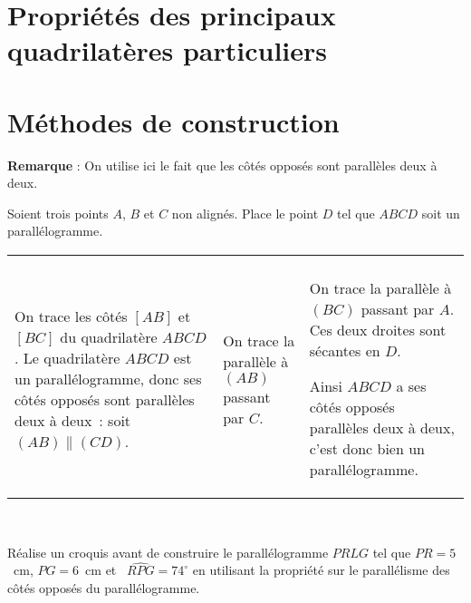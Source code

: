 \section{Propriétés des principaux quadrilatères particuliers}



\section{Méthodes de construction}

\begin{methode*1}

\vspace{0.8em}
\textcolor{H1}{\textbf{Remarque}} : On utilise ici le fait que les côtés opposés sont parallèles deux à deux.

\begin{exemple*1}
Soient trois points $A$, $B$ et $C$ non alignés. Place le point $D$ tel que $ABCD$ soit un parallélogramme.\\[0.5em]


\begin{tabularx}{\textwidth}{X|X|X}
   \qquad  &  &  \\ 
 
 
 On trace les côtés $[AB]$ et $[BC]$ du quadrilatère $ABCD$. Le quadrilatère $ABCD$ est un parallélogramme, donc ses côtés opposés sont parallèles deux à deux : soit $(AB) \parallel (CD)$. & On trace la parallèle à $(AB)$ passant par $C$. & On trace la parallèle à $(BC)$ passant par $A$. Ces deux droites sont sécantes en $D$.
 
 Ainsi $ABCD$ a ses côtés opposés parallèles deux à deux, c'est donc bien un parallélogramme. \\
\end{tabularx} \\[1em]

\end{exemple*1}

\exercice
Réalise un croquis avant de construire le parallélogramme $PRLG$ tel que $PR = 5$ cm, $PG = 6$ cm et  $\widehat{RPG} = 74^\circ$ en utilisant la propriété sur le parallélisme des côtés opposés du parallélogramme.

\end{methode*1}


